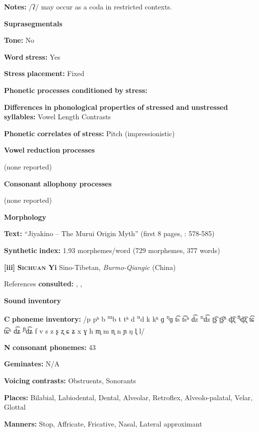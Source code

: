 \begin{styleBody}
\textbf{Notes:} /ʔ/ may occur as a coda in restricted contexts.

\textbf{Suprasegmentals}

\textbf{Tone:} No

\textbf{Word} \textbf{stress:} Yes

\textbf{Stress} \textbf{placement:} Fixed

\textbf{Phonetic} \textbf{processes} \textbf{conditioned} \textbf{by} \textbf{stress:}

\textbf{Differences} \textbf{in} \textbf{phonological} \textbf{properties} \textbf{of} \textbf{stressed} \textbf{and} \textbf{unstressed} \textbf{syllables:} Vowel Length Contrasts

\textbf{Phonetic} \textbf{correlates} \textbf{of} \textbf{stress:} Pitch (impressionistic)

\textbf{Vowel} \textbf{reduction} \textbf{processes}

(none reported)

\textbf{Consonant} \textbf{allophony} \textbf{processes}

(none reported)

\textbf{Morphology}

\textbf{Text:} “Jiyakino -- The Murui Origin Myth” (first 8 pages, \citealt{Wojtylak2017}: 578-585)

\textbf{Synthetic} \textbf{index:} 1.93 morphemes/word (729 morphemes, 377 words)

\textbf{[iii]}   \textbf{\textsc{Sichuan} \textbf{Yi}}  Sino-Tibetan, \textit{Burmo-Qiangic} (China)

References \textbf{consulted:} \citet{Gerner2013}, \citet{Maoji1997}, \citet{Merrifield2012}

\textbf{Sound} \textbf{inventory}

\textbf{C} \textbf{phoneme} \textbf{inventory:} /p pʰ b \textsuperscript{m}b t tʰ d \textsuperscript{n}d k kʰ ɡ \textsuperscript{ŋ}ɡ t͡s t͡sʰ d͡z \textsuperscript{n}d͡z ʈ͡ʂ ʈ͡ʂʰ ɖ͡ʐ \textsuperscript{ɳ}ɖ͡ʐ t͡ɕ t͡ɕʰ d͡ʑ \textsuperscript{ɲ}d͡ʑ f v s z ʂ ʐ ɕ ʑ x ɣ h m̥ m n̥ n ɲ ŋ l̥ l/

\textbf{N} \textbf{consonant} \textbf{phonemes:} 43

\textbf{Geminates:} N/A

\textbf{Voicing} \textbf{contrasts:} Obstruents, Sonorants

\textbf{Places:} Bilabial, Labiodental, Dental, Alveolar, Retroflex, Alveolo-palatal, Velar, Glottal

\textbf{Manners:} Stop, Affricate, Fricative, Nasal, Lateral approximant


\end{styleBody}
